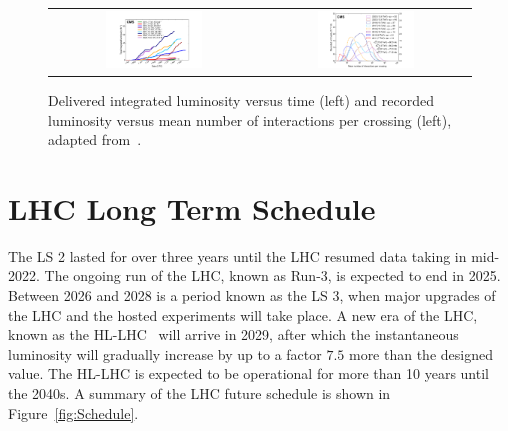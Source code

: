 \begin{figure}[tbh!]
 \begin{center}
 \begin{tabular}{cc}
 \includegraphics[width=0.48\textwidth]{figures/Part2/LHC/twikilumi}&
 \includegraphics[width=0.48\textwidth]{figures/Part2/LHC/twikipu}\\
 \end{tabular}
 \caption{Delivered integrated luminosity versus time (left) and recorded luminosity versus mean number of interactions per crossing (left), adapted from~\cite{twiki:lumi}.}
 \label{fig:twikilumi}
 \end{center}
\end{figure} 

\section{LHC Long Term Schedule}
\label{sec:Plan}

The \ac{LS} 2 lasted for over three years until the \ac{LHC} resumed data taking in mid-2022. The ongoing run of the \ac{LHC}, known as Run-3, is expected to end in 2025. Between 2026 and 2028 is a period known as the \ac{LS} 3, when major upgrades of the \ac{LHC} and the hosted experiments will take place. A new era of the \ac{LHC}, known as the \ac{HL-LHC}~\cite{Apollinari:2017lan} will arrive in 2029, after which the instantaneous luminosity will gradually increase by up to a factor $7.5$ more than the designed value. The \ac{HL-LHC} is expected to be operational for more than 10 years until the 2040s. A summary of the \ac{LHC} future schedule is shown in Figure~\ref{fig:Schedule}.

